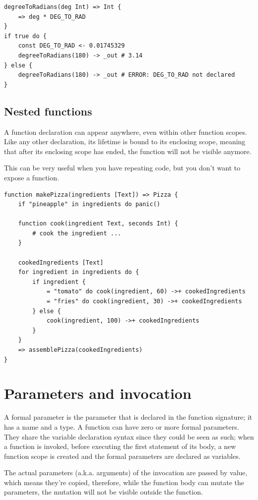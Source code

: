 \begin{verbatim}
degreeToRadians(deg Int) => Int {
	=> deg * DEG_TO_RAD
}
if true do {
	const DEG_TO_RAD <- 0.01745329
	degreeToRadians(180) -> _out # 3.14
} else {
	degreeToRadians(180) -> _out # ERROR: DEG_TO_RAD not declared
}
\end{verbatim}

\subsection{Nested functions}

A function declaration can appear anywhere, even within other function scopes.
Like any other declaration, its lifetime is bound to its enclosing scope,
meaning that after its enclosing scope has ended, the function will not be
visible anymore.

This can be very useful when you have repeating code, but you don't want to
expose a function.

\begin{verbatim}
function makePizza(ingredients [Text]) => Pizza {
	if "pineapple" in ingredients do panic()

	function cook(ingredient Text, seconds Int) {
		# cook the ingredient ...
	}

	cookedIngredients [Text]
	for ingredient in ingredients do {
		if ingredient {
			= "tomato" do cook(ingredient, 60) ->+ cookedIngredients
			= "fries" do cook(ingredient, 30) ->+ cookedIngredients
		} else {
			cook(ingredient, 100) ->+ cookedIngredients
		}
	}
	=> assemblePizza(cookedIngredients)
}
\end{verbatim}

\clearpage

\section{Parameters and invocation}

A formal parameter is the parameter that is declared in the function signature;
it has a name and a type. A function can have zero or more formal parameters.
They share the variable declaration syntax since they could be seen as such;
when a function is invoked, before executing the first statement of its body, a
new function scope is created and the formal parameters are declared as
variables.

The actual parameters (a.k.a. arguments) of the invocation are passed by value,
which means they're copied, therefore, while the function body can mutate the
parameters, the mutation will not be visible outside the function.


